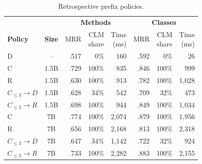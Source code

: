 \begin{table}[t]
\centering
\caption{Retrospective prefix policies.}
\label{tab:prefix-policies}
\setlength{\tabcolsep}{1.6pt}
\small
\begin{tabular}{l@{\hspace{3pt}}c rrr rrr}
\toprule
 & & \multicolumn{3}{c}{\textbf{Methods}} & \multicolumn{3}{c}{\textbf{Classes}} \\
\cmidrule(lr){3-5}\cmidrule(lr){6-8}
\textbf{Policy} & \textbf{Size} & MRR & \shortstack{CLM\\share} & \shortstack{Time\\(ms)} & MRR & \shortstack{CLM\\share} & \shortstack{Time\\(ms)} \\
\midrule
D & -- & .517 & 0\% & 160 & .592 & 0\% & 26 \\
C & 1.5B & .729 & 100\% & 835 & .846 & 100\% & 999 \\
R & 1.5B & .630 & 100\% & 913 & .782 & 100\% & 1{,}028 \\
$C_{\leq3}\!\to\!D$ & 1.5B & .628 & 34\% & 542 & .709 & 32\% & 473 \\
$C_{\leq3}\!\to\!R$ & 1.5B & .698 & 100\% & 944 & .849 & 100\% & 1{,}034 \\
\midrule
C & 7B & .774 & 100\% & 2{,}074 & .879 & 100\% & 1{,}956 \\
R & 7B & .656 & 100\% & 2{,}168 & .813 & 100\% & 2{,}318 \\
$C_{\leq3}\!\to\!D$ & 7B & .647 & 34\% & 1{,}142 & .722 & 32\% & 924 \\
$C_{\leq3}\!\to\!R$ & 7B & .733 & 100\% & 2{,}282 & .883 & 100\% & 2{,}155 \\
\bottomrule
\end{tabular}
\end{table}
